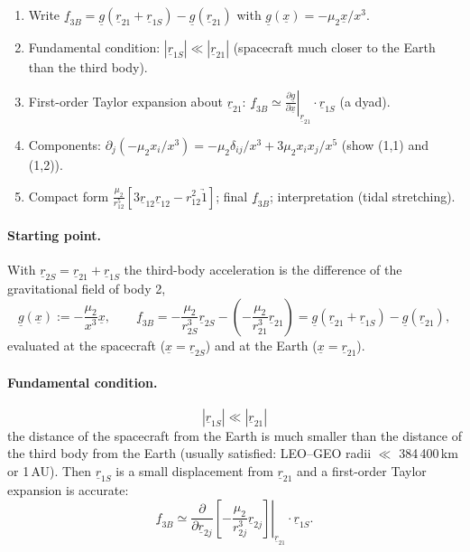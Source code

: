 \begin{outline}
\begin{enumerate}
\item Write $\underline f_{3B}=\underline g(\underline r_{21}+\underline r_{1S})-\underline g(\underline r_{21})$ with $\underline g(\underline x)=-\mu_2\underline x/x^3$.
\item Fundamental condition: $|\underline r_{1S}|\ll|\underline r_{21}|$ (spacecraft much closer to the Earth than the third body).
\item First-order Taylor expansion about $\underline r_{21}$: $\underline f_{3B}\simeq\left.\frac{\partial\underline g}{\partial\underline x}\right|_{\underline r_{21}}\cdot\underline r_{1S}$ (a dyad).
\item Components: $\partial_j(-\mu_2x_i/x^3)=-\mu_2\delta_{ij}/x^3+3\mu_2x_ix_j/x^5$ (show (1,1) and (1,2)).
\item Compact form $\frac{\mu_2}{r_{12}^5}\left[3\underline r_{12}\underline r_{12}-r_{12}^2\underrightarrow{1}\right]$; final $\underline f_{3B}$; interpretation (tidal stretching).
\end{enumerate}
\end{outline}

\answer
\paragraph{Starting point.} With $\underline r_{2S}=\underline r_{21}+\underline r_{1S}$ the third-body acceleration is the difference of the
gravitational field of body 2,
\begin{equation}
\underline g(\underline x):=-\frac{\mu_2}{x^3}\underline x,\qquad
\underline f_{3B}=-\frac{\mu_2}{r_{2S}^3}\underline r_{2S}-\left(-\frac{\mu_2}{r_{21}^3}\underline r_{21}\right)
=\underline g(\underline r_{21}+\underline r_{1S})-\underline g(\underline r_{21}),
\end{equation}
evaluated at the spacecraft ($\underline x=\underline r_{2S}$) and at the Earth ($\underline x=\underline r_{21}$).

\paragraph{Fundamental condition.}
\begin{equation}
\boxed{\;|\underline r_{1S}|\ll|\underline r_{21}|\;}
\end{equation}
the distance of the spacecraft from the Earth is much smaller than the distance of the third body from the Earth (usually satisfied:
LEO--GEO radii $\ll$ 384\,400\,km or 1\,AU). Then $\underline r_{1S}$ is a small displacement from $\underline r_{21}$ and a first-order Taylor
expansion is accurate:
\begin{equation}
\underline f_{3B}\simeq\left.\frac{\partial}{\partial\underline r_{2j}}\left[-\frac{\mu_2}{r_{2j}^3}\underline r_{2j}\right]\right|_{\underline r_{21}}\!\cdot\underline r_{1S}.
\end{equation}

